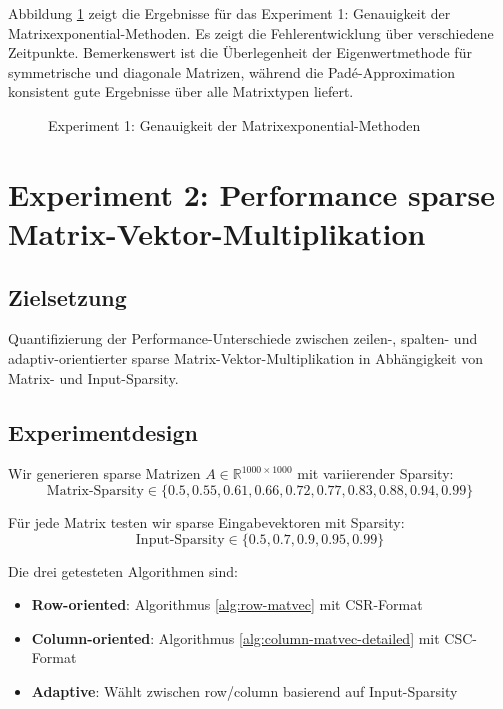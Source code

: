 \documentclass[a4paper,12pt]{report}
\theoremstyle{definition}
\begin{document}
	Abbildung \ref{fig:exp1} zeigt die Ergebnisse für das Experiment 1: Genauigkeit der Matrixexpo\-nential-Methoden. Es zeigt die Fehlerentwicklung über verschiedene Zeitpunkte. Bemerkenswert ist die Überlegenheit der Eigenwertmethode für symmetrische und diagonale Matrizen, während die Padé-Approximation konsistent gute Ergebnisse über alle Matrixtypen liefert.
	
	\begin{figure}[H]
		\centering
		\caption{Experiment 1: Genauigkeit der Matrixexponential-Methoden}
		\label{fig:exp1}
	\end{figure}
	
	\section{Experiment 2: Performance sparse Matrix-Vektor-Multipli\-kation}
	
	\subsection{Zielsetzung}
	
	Quantifizierung der Performance-Unterschiede zwischen zeilen-, spalten- und adaptiv-orientierter sparse Matrix-Vektor-Multiplikation in Abhängigkeit von Matrix- und Input-Sparsity.
	
	\subsection{Experimentdesign}
	
	Wir generieren sparse Matrizen $A \in \mathbb{R}^{1000 \times 1000}$ mit variierender Sparsity:
	\[
	\text{Matrix-Sparsity} \in \{0.5, 0.55, 0.61, 0.66, 0.72, 0.77, 0.83, 0.88, 0.94, 0.99\}
	\]
	
	Für jede Matrix testen wir sparse Eingabevektoren mit Sparsity:
	\[
	\text{Input-Sparsity} \in \{0.5, 0.7, 0.9, 0.95, 0.99\}
	\]
	
	Die drei getesteten Algorithmen sind:
	
	\begin{itemize}
		\item \textbf{Row-oriented}: Algorithmus \ref{alg:row-matvec} mit CSR-Format
		\item \textbf{Column-oriented}: Algorithmus \ref{alg:column-matvec-detailed} mit CSC-Format
		\item \textbf{Adaptive}: Wählt zwischen row/column basierend auf Input-Sparsity
	\end{itemize}
	
\end{document}

